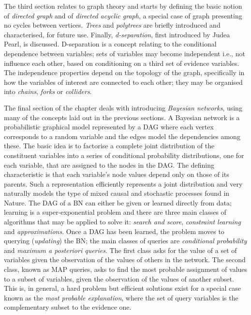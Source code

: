 The third section relates to graph theory and starts by defining the basic notion of \textit{directed graph} and of \textit{directed acyclic graph}, a special case of graph presenting no cycles between vertices.
\textit{Trees} and \textit{polytrees} are briefly introduced and characterised, for future use.
Finally, \textit{d-separation}, first introduced by Judea Pearl, is discussed.
D-separation is a concept relating to the conditional dependence between variables; sets of variables may become independent i.e., not influence each other, based on conditioning on a third set of evidence variables.
The independence properties depend on the topology of the graph, specifically in how the variables of interest are connected to each other; they may be organised into \textit{chains}, \textit{forks} or \textit{colliders}.

The final section of the chapter deals with introducing \textit{Bayesian networks}, using many of the concepts laid out in the previous sections.
A Bayesian network is a probabilistic graphical model represented by a DAG where each vertex corresponds to a random variable and the edges model the dependencies among these.
The basic idea is to factorise a complete joint distribution of the constituent variables into a series of conditional probability distributions, one for each variable, that are assigned to the nodes in the DAG.
The defining characteristic is that each variable's node values depend only on those of its parents.
Such a representation efficiently represents a joint distribution and very naturally models the type of mixed causal and stochastic processes found in Nature.
The DAG of a BN can either be given or learned directly from data; learning is a super-exponential problem and there are three main classes of algorithms that may be applied to solve it: \textit{search and score}, \textit{constraint learning} and \textit{approximations}.
Once a DAG has been learned, the problem moves to querying (\textit{updating}) the BN; the main classes of queries are \textit{conditional probability} and \textit{maximum a posteriori queries}.
The first class asks for the value of a set of variables given the observation of the values of others in the network.
The second class, known as MAP queries, asks to find the most probable assignment of values to a subset of variables, given the observation of the values of another subset.
This is, in general, a hard problem but efficient solutions exist for a special case known as the \textit{most probable explanation}, where the set of query variables is the complementary subset to the evidence one.